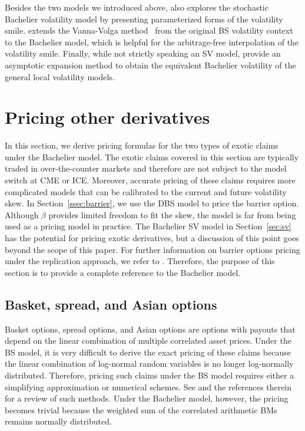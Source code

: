 \documentclass[a4paper,review]{elsarticle}
\begin{document}
Besides the two models we introduced above, \citet{sun2016implied} also explores the stochastic Bachelier volatility model by presenting parameterized forms of the volatility smile. \citet{perederiy2018vannavolga} extends the Vanna-Volga method~\citep{castagna2007option} from the original BS volatility context to the Bachelier model, which is helpful for the arbitrage-free interpolation of the volatility smile. Finally, while not strictly speaking an SV model, \citet{karami2018appl} provide an asymptotic expansion method to obtain the equivalent Bachelier volatility of the general local volatility models.

\section{Pricing other derivatives}\label{sec:exotic} \noindent 
In this section, we derive pricing formulas for the two types of exotic claims under the Bachelier model. The exotic claims covered in this section are typically traded in over-the-counter markets and therefore are not subject to the model switch at CME or ICE. Moreover, accurate pricing of these claims requires more complicated models that can be calibrated to the current and future volatility skew. In Section~\ref{ssec:barrier}, we use the DBS model to price the barrier option. Although $\beta$ provides limited freedom to fit the skew, the model is far from being used as a pricing model in practice. The Bachelier SV model in Section~\ref{sec:sv} has the potential for pricing exotic derivatives, but a discussion of this point goes beyond the scope of this paper. For further information on barrier options pricing under the replication approach, we refer to \citet{derman1995static}. Therefore, the purpose of this section is to provide a complete reference to the Bachelier model.

\subsection{Basket, spread, and Asian options} \noindent
Basket options, spread options, and Asian options are options with payouts that depend on the linear combination of multiple correlated asset prices.
Under the BS model, it is very difficult to derive the exact pricing of these claims because the linear combination of log-normal random variables is no longer log-normally distributed. Therefore, pricing such claims under the BS model requires either a simplifying approximation or numerical schemes. See \citet{choi2018sumbsm} and the references therein for a review of such methods. Under the Bachelier model, however, the pricing becomes trivial because the weighted sum of the correlated arithmetic BMs remains normally distributed. 
\end{document}
